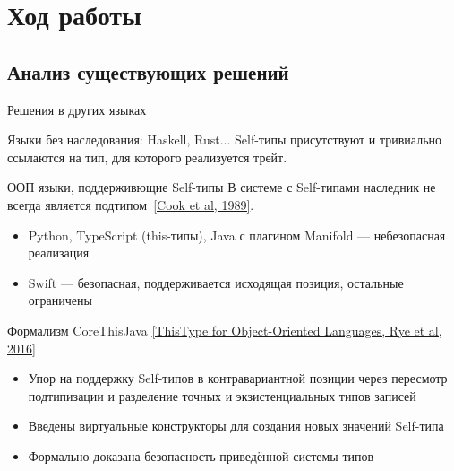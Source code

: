 \documentclass[handout,aspectratio=169,usenames,dvipsnames]{beamer}
\begin{document}
    \section{Ход работы}


    \subsection{Анализ существующих решений}

    \begin{frame}[fragile]{Решения в других языках}

        \begin{block}{Языки без наследования: Haskell, Rust...}
            Self-типы присутствуют и тривиально ссылаются на тип, для которого реализуется трейт.
        \end{block}

        \begin{block}{ООП языки, поддерживющие Self-типы}
            В системе с Self-типами наследник не всегда является подтипом~\href{https://dl.acm.org/doi/pdf/10.1145/96709.96721}{[Cook et al, 1989]}.
            \begin{itemize}
                \item Python, TypeScript (this-типы), Java с плагином Manifold --- небезопасная реализация
                \item Swift --- безопасная, поддерживается исходящая позиция, остальные ограничены
            \end{itemize}
        \end{block}

        \begin{block}{Формализм CoreThisJava \href{https://dl.acm.org/doi/pdf/10.1145/2888392}{[ThisType for Object-Oriented Languages, Rye et al, 2016]}}
            \begin{itemize}
                \item Упор на поддержку Self-типов в контравариантной позиции через пересмотр подтипизации и разделение точных и экзистенциальных типов записей
                \item Введены виртуальные конструкторы для создания новых значений Self-типа
                \item Формально доказана безопасность приведённой системы типов
            \end{itemize}
        \end{block}
    \end{frame}
\end{document}

